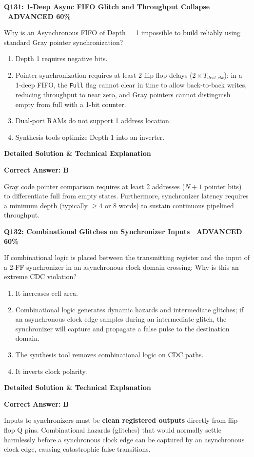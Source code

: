 \documentclass[11pt,a4paper]{article}
\newcommand{\badgeadv}{{\color{white}\colorbox{advred}{\bfseries\sffamily\tiny\ ADVANCED 60\%\ }}}
\newenvironment{qbox}[2]{%
  \begin{mdframed}[style=qstyle]%
  {\bfseries\sffamily\color{primaryblue}#1 \hfill #2}\par\vspace{2pt}%
}{%
  \end{mdframed}%
}
\newenvironment{ansbox}{%
  \begin{mdframed}[style=ansstyle]%
  {\bfseries\sffamily\color{ansgreen}\small Detailed Solution \& Technical Explanation}\par\vspace{2pt}\small%
}{%
  \end{mdframed}%
}
\begin{document}
\begin{qbox}{Q131: 1-Deep Async FIFO Glitch and Throughput Collapse}{\badgeadv}
Why is an Asynchronous FIFO of Depth = 1 impossible to build reliably using standard Gray pointer synchronization?
\begin{enumerate}[label=\textbf{\Alph*.}]
  \item Depth 1 requires negative bits.
  \item Pointer synchronization requires at least 2 flip-flop delays ($2 \times T_{dest\_clk}$); in a 1-deep FIFO, the \texttt{Full} flag cannot clear in time to allow back-to-back writes, reducing throughput to near zero, and Gray pointers cannot distinguish empty from full with a 1-bit counter.
  \item Dual-port RAMs do not support 1 address location.
  \item Synthesis tools optimize Depth 1 into an inverter.
\end{enumerate}
\end{qbox}
\begin{ansbox}
\textbf{Correct Answer: B}

Gray code pointer comparison requires at least 2 addresses ($N+1$ pointer bits) to differentiate full from empty states. Furthermore, synchronizer latency requires a minimum depth (typically $\ge 4$ or 8 words) to sustain continuous pipelined throughput.
\end{ansbox}

\begin{qbox}{Q132: Combinational Glitches on Synchronizer Inputs}{\badgeadv}
If combinational logic is placed between the transmitting register and the input of a 2-FF synchronizer in an asynchronous clock domain crossing:
Why is this an extreme CDC violation?
\begin{enumerate}[label=\textbf{\Alph*.}]
  \item It increases cell area.
  \item Combinational logic generates dynamic hazards and intermediate glitches; if an asynchronous clock edge samples during an intermediate glitch, the synchronizer will capture and propagate a false pulse to the destination domain.
  \item The synthesis tool removes combinational logic on CDC paths.
  \item It inverts clock polarity.
\end{enumerate}
\end{qbox}
\begin{ansbox}
\textbf{Correct Answer: B}

Inputs to synchronizers must be \textbf{clean registered outputs} directly from flip-flop Q pins. Combinational hazards (glitches) that would normally settle harmlessly before a synchronous clock edge can be captured by an asynchronous clock edge, causing catastrophic false transitions.
\end{ansbox}
\end{document}
